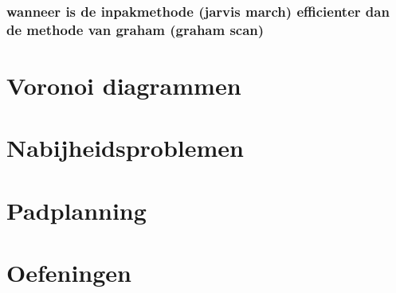 \documentclass[12pt,a4paper]{article}
\begin{document}
\section{wanneer is de inpakmethode (jarvis march) efficienter dan de methode van graham (graham scan)}
\fi

\part{Voronoi diagrammen}

\iffalse
\section{Bewijs: ``Een voronoi veelhoek van een punt $p_i$ is begrensd <=> $p_i$ element van $inw(CH(S))$'' Bespreek het nut van deze stelling.}
\section{Bewijs dat minimale doorloopboom deelverzameling is van de Delaunay triangulatie. Wat is het nut van deze eigenschap?}
\section{Bewijs: "Twee dichtste buren hebben een gemeenschappelijke voronoi zijde"}
\section{Geen een strategie en een hoog-niveau algoritme  voor het vinden van de maximale lege cirkel binnen de COV van een verzameling punten.}
\section{Bespreek de event punten in het algoritme van Fortune Welke acties moeten ondernomen worden?}
\fi

\part{Nabijheidsproblemen}



\part{Padplanning}


\part{Oefeningen}











\end{document}
